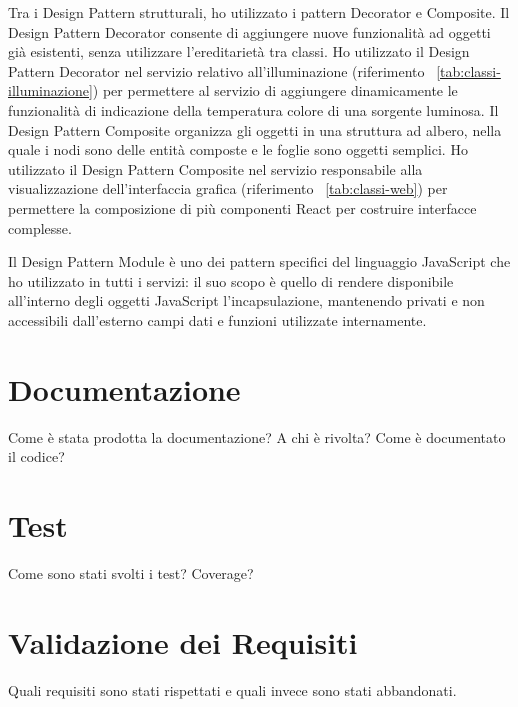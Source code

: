 Tra i Design Pattern strutturali, ho utilizzato i pattern Decorator e Composite.
Il Design Pattern Decorator consente di aggiungere nuove funzionalità ad oggetti già esistenti, senza utilizzare l'ereditarietà tra classi.
Ho utilizzato il Design Pattern Decorator nel servizio relativo all'illuminazione (riferimento ~\ref{tab:classi-illuminazione}) per permettere al servizio di aggiungere dinamicamente le funzionalità di indicazione della temperatura colore di una sorgente luminosa.
Il Design Pattern Composite organizza gli oggetti in una struttura ad albero, nella quale i nodi sono delle entità composte e le foglie sono oggetti semplici.
Ho utilizzato il Design Pattern Composite nel servizio responsabile alla visualizzazione dell'interfaccia grafica (riferimento ~\ref{tab:classi-web}) per permettere la composizione di più componenti React per costruire interfacce complesse.

Il Design Pattern Module è uno dei pattern specifici del linguaggio JavaScript che ho utilizzato in tutti i servizi: il suo scopo è quello di rendere disponibile all’interno degli oggetti JavaScript l’incapsulazione, mantenendo privati e non accessibili dall’esterno campi dati e funzioni utilizzate internamente.

\section{Documentazione}

Come è stata prodotta la documentazione? A chi è rivolta? Come è documentato il codice?

\section{Test}

Come sono stati svolti i test? Coverage?


\section{Validazione dei Requisiti}

Quali requisiti sono stati rispettati e quali invece sono stati abbandonati.
